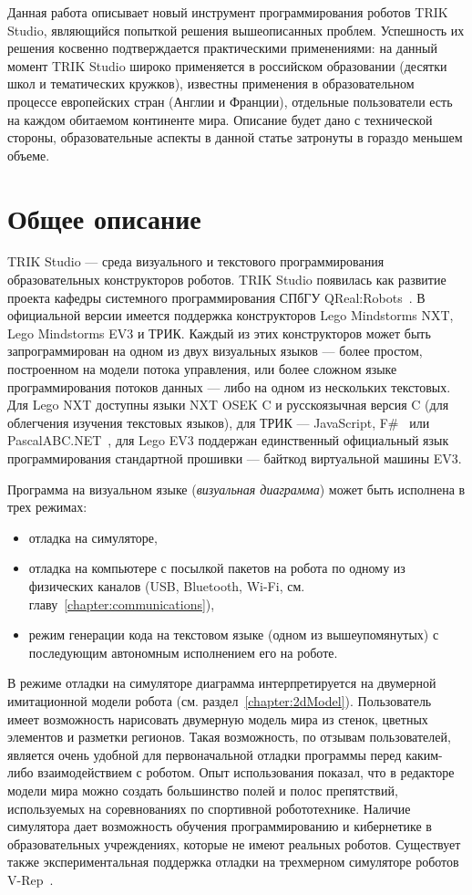 \documentclass[a5paper]{article}
\begin{document}
Данная работа описывает новый инструмент программирования роботов TRIK Studio, являющийся попыткой решения вышеописанных проблем. Успешность их решения косвенно подтверждается практическими применениями: на данный момент TRIK Studio широко применяется в российском образовании (десятки школ и тематических кружков), известны применения в образовательном процессе европейских стран (Англии и Франции), отдельные пользователи есть на каждом обитаемом континенте мира. Описание будет дано с технической стороны, образовательные аспекты в данной статье затронуты в гораздо меньшем объеме.

\section{Общее описание}
\label{chapter:commonDescription}

TRIK Studio --- среда визуального и текстового программирования образовательных конструкторов роботов. TRIK Studio появилась как развитие проекта кафедры системного программирования СПбГУ QReal:Robots~\cite{terekhov2013sreda}. В официальной версии имеется поддержка конструкторов Lego Mindstorms NXT, Lego Mindstorms EV3 и ТРИК. Каждый из этих конструкторов может быть запрограммирован на одном из двух визуальных языков --- более простом, построенном на модели потока управления, или более сложном языке программирования потоков данных --- либо на одном из нескольких текстовых. Для Lego NXT доступны языки NXT OSEK C и русскоязычная версия C (для облегчения изучения текстовых языков), для ТРИК --- JavaScript, F\#~\cite{kirsanov2014robotics} или PascalABC.NET~\cite{doliner2014basics}, для Lego EV3 поддержан единственный официальный язык программирования стандартной прошивки --- байткод виртуальной машины EV3.

Программа на визуальном языке (\textit{визуальная диаграмма}) может быть исполнена в трех режимах: 
\begin{itemize}
    \item отладка на симуляторе,
    \item отладка на компьютере с посылкой пакетов на робота по одному из физических каналов (USB, Bluetooth, Wi-Fi, см. главу~\ref{chapter:communications}),
    \item режим генерации кода на текстовом языке (одном из вышеупомянутых) с последующим автономным исполнением его на роботе. 
\end{itemize}

В режиме отладки на симуляторе диаграмма интерпретируется на двумерной имитационной модели робота (см. раздел~\ref{chapter:2dModel}). Пользователь имеет возможность нарисовать двумерную модель мира из стенок, цветных элементов и разметки регионов. Такая возможность, по отзывам пользователей, является очень удобной для первоначальной отладки программы перед каким-либо взаимодействием с роботом. Опыт использования показал, что в редакторе модели мира можно создать большинство полей и полос препятствий, используемых на соревнованиях по спортивной робототехнике. Наличие симулятора дает возможность обучения программированию и кибернетике в образовательных учреждениях, которые не имеют реальных роботов. Существует также экспериментальная поддержка отладки на трехмерном симуляторе роботов V-Rep~\cite{rohmer2013v}.
\end{document}
